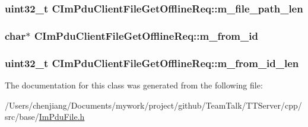 \subsubsection[{m\+\_\+file\+\_\+path\+\_\+len}]{\setlength{\rightskip}{0pt plus 5cm}uint32\+\_\+t C\+Im\+Pdu\+Client\+File\+Get\+Offline\+Req\+::m\+\_\+file\+\_\+path\+\_\+len\hspace{0.3cm}{\ttfamily [private]}}\label{class_c_im_pdu_client_file_get_offline_req_a52304e8ddbbe4abd4f6fb5eae6088fe7}
\hypertarget{class_c_im_pdu_client_file_get_offline_req_ac462587c5a64b4bb8811aa2596f8bfee}{}
\subsubsection[{m\+\_\+from\+\_\+id}]{\setlength{\rightskip}{0pt plus 5cm}char$\ast$ C\+Im\+Pdu\+Client\+File\+Get\+Offline\+Req\+::m\+\_\+from\+\_\+id\hspace{0.3cm}{\ttfamily [private]}}\label{class_c_im_pdu_client_file_get_offline_req_ac462587c5a64b4bb8811aa2596f8bfee}
\hypertarget{class_c_im_pdu_client_file_get_offline_req_a764223485ed378c9993b6d394b84562a}{}
\subsubsection[{m\+\_\+from\+\_\+id\+\_\+len}]{\setlength{\rightskip}{0pt plus 5cm}uint32\+\_\+t C\+Im\+Pdu\+Client\+File\+Get\+Offline\+Req\+::m\+\_\+from\+\_\+id\+\_\+len\hspace{0.3cm}{\ttfamily [private]}}\label{class_c_im_pdu_client_file_get_offline_req_a764223485ed378c9993b6d394b84562a}


The documentation for this class was generated from the following file\+:\begin{DoxyCompactItemize}
\item 
/\+Users/chenjiang/\+Documents/mywork/project/github/\+Team\+Talk/\+T\+T\+Server/cpp/src/base/\hyperlink{_im_pdu_file_8h}{Im\+Pdu\+File.\+h}\end{DoxyCompactItemize}

